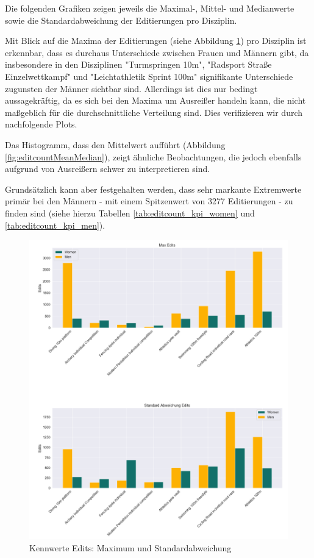 \documentclass[11pt]{article}
\begin{document}
Die folgenden Grafiken zeigen jeweils die Maximal-, Mittel- und Medianwerte sowie die Standardabweichung der Editierungen pro Disziplin. 

Mit Blick auf die Maxima der Editierungen (siehe Abbildung \ref{fig:editcountMaxStd}) pro Disziplin ist erkennbar, dass es durchaus Unterschiede zwischen Frauen und Männern gibt, da insbesondere in den Disziplinen "Turmspringen 10m", "Radsport Straße Einzelwettkampf" und "Leichtathletik Sprint 100m" signifikante Unterschiede zugunsten der Männer sichtbar sind. Allerdings ist dies nur bedingt aussagekräftig, da es sich bei den Maxima um Ausreißer handeln kann, die nicht maßgeblich für die durchschnittliche Verteilung sind. Dies verifizieren wir durch nachfolgende Plots.

Das Histogramm, dass den Mittelwert aufführt (Abbildung \ref{fig:editcountMeanMedian}), zeigt ähnliche Beobachtungen, die jedoch ebenfalls aufgrund von Ausreißern schwer zu interpretieren sind.

Grundsätzlich kann aber festgehalten werden, dass sehr markante Extremwerte primär bei den Männern - mit einem Spitzenwert von 3277 Editierungen - zu finden sind (siehe hierzu Tabellen \ref{tab:editcount_kpi_women} und \ref{tab:editcount_kpi_men}).

\begin{figure}
\includegraphics[width=1\textwidth]{figures/editcount_max_std.png}
\caption[Kennwerte Editierungen: Maximum und Standardabweichung]{Kennwerte Edits: Maximum und Standardabweichung}
\label{fig:editcountMaxStd}
\end{figure}
\end{document}
